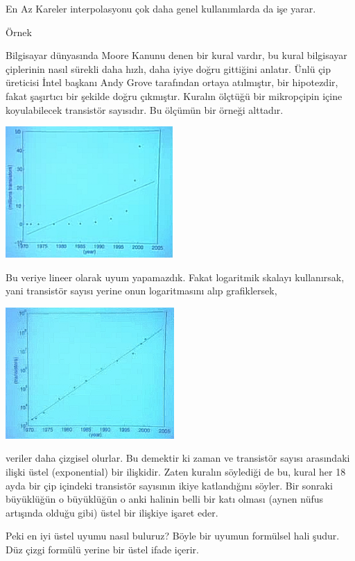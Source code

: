 \documentclass[12pt,fleqn]{article}\usepackage{../../common}
\begin{document}
En Az Kareler interpolasyonu çok daha genel kullanımlarda da işe yarar. 

Örnek

Bilgisayar dünyasında Moore Kanunu denen bir kural vardır, bu kural bilgisayar
çiplerinin nasıl sürekli daha hızlı, daha iyiye doğru gittiğini anlatır. Ünlü
çip üreticisi İntel başkanı Andy Grove tarafından ortaya atılmıştır, bir
hipotezdir, fakat şaşırtıcı bir şekilde doğru çıkmıştır. Kuralın ölçtüğü bir
mikropçipin içine koyulabilecek transistör sayısıdır. Bu ölçümün bir örneği
alttadır.

\begin{center}
\includegraphics[height=5cm]{9_7.png}
\end{center}

Bu veriye lineer olarak uyum yapamazdık. Fakat logaritmik skalayı kullanırsak,
yani transistör sayısı yerine onun logaritmasını alıp grafiklersek,

\begin{center}
\includegraphics[height=5cm]{9_8.png}
\end{center}

veriler daha çizgisel olurlar. Bu demektir ki zaman ve transistör sayısı
arasındaki ilişki üstel (exponential) bir ilişkidir. Zaten kuralın söylediği de
bu, kural her 18 ayda bir çip içindeki transistör sayısının ikiye katlandığını
söyler. Bir sonraki büyüklüğün o büyüklüğün o anki halinin belli bir katı olması
(aynen nüfus artışında olduğu gibi) üstel bir ilişkiye işaret eder.

Peki en iyi üstel uyumu nasıl buluruz? Böyle bir uyumun formülsel hali
şudur. Düz çizgi formülü yerine bir üstel ifade içerir. 
\end{document}
